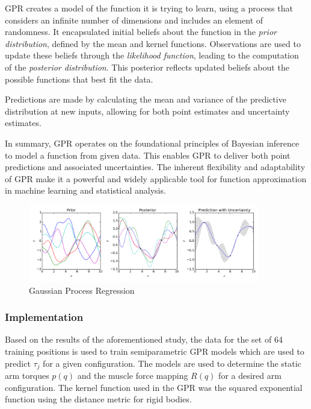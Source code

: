 GPR creates a model of the function it is trying to learn, using a process that considers an infinite number of dimensions and includes an element of randomness. It encapsulated initial beliefs about the function in the \textit{prior distribution}, defined by the mean and kernel functions. Observations are used to update these beliefs through the \textit{likelihood function}, leading to the computation of the \textit{posterior distribution}. This posterior reflects updated beliefs about the possible functions that best fit the data.

Predictions are made by calculating the mean and variance of the predictive distribution at new inputs, allowing for both point estimates and uncertainty estimates. 

In summary, GPR operates on the foundational principles of Bayesian inference to model a function from given data. This enables GPR to deliver both point predictions and associated uncertainties. The inherent flexibility and adaptability of GPR make it a powerful and widely applicable tool for function approximation in machine learning and statistical analysis. \cite{GPR}

\begin{figure}[h!]
    \centering
    \includegraphics[width=0.9\textwidth]{Pictures/Model/Gaussian_Process_Regression.png}
    \caption{Gaussian Process Regression \cite{GPR_Image}}
    \label{fig:GPR}
\end{figure}





\subsubsection{Implementation}

Based on the results of the aforementioned study, the data for the set of 64 training positions is used to train semiparametric GPR models which are used to predict $\tau_j$ for a given configuration. The models are used to determine the static arm torques $p(q)$ and the muscle force mapping $R(q)$ for a desired arm configuration.
The kernel function used in the GPR was the squared exponential function using the distance metric for rigid bodies. 
 
